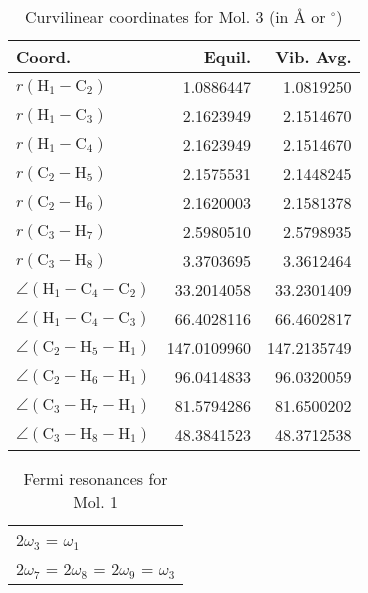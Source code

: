 \begin{table}
\centering
\caption{Curvilinear coordinates for Mol. 3 (in \AA{} or $^\circ$)}
\begin{tabular}{lrr}
       Coord.         &             Equil. &          Vib. Avg. \\
\hline
$r(\text{H}_{1} - \text{C}_{2})$ &          1.0886447 &          1.0819250 \\
$r(\text{H}_{1} - \text{C}_{3})$ &          2.1623949 &          2.1514670 \\
$r(\text{H}_{1} - \text{C}_{4})$ &          2.1623949 &          2.1514670 \\
$r(\text{C}_{2} - \text{H}_{5})$ &          2.1575531 &          2.1448245 \\
$r(\text{C}_{2} - \text{H}_{6})$ &          2.1620003 &          2.1581378 \\
$r(\text{C}_{3} - \text{H}_{7})$ &          2.5980510 &          2.5798935 \\
$r(\text{C}_{3} - \text{H}_{8})$ &          3.3703695 &          3.3612464 \\
$\angle(\text{H}_{1} - \text{C}_{4} - \text{C}_{2})$ &         33.2014058 &         33.2301409 \\
$\angle(\text{H}_{1} - \text{C}_{4} - \text{C}_{3})$ &         66.4028116 &         66.4602817 \\
$\angle(\text{C}_{2} - \text{H}_{5} - \text{H}_{1})$ &        147.0109960 &        147.2135749 \\
$\angle(\text{C}_{2} - \text{H}_{6} - \text{H}_{1})$ &         96.0414833 &         96.0320059 \\
$\angle(\text{C}_{3} - \text{H}_{7} - \text{H}_{1})$ &         81.5794286 &         81.6500202 \\
$\angle(\text{C}_{3} - \text{H}_{8} - \text{H}_{1})$ &         48.3841523 &         48.3712538 \\
\end{tabular}
\end{table}

\begin{table}
\centering
\caption{Fermi resonances for Mol. 1}
\begin{tabular}{l}
2$\omega_{3 }$ = $\omega_{1 }$ \\
2$\omega_{7 }$ = 2$\omega_{8 }$ = 2$\omega_{9 }$ = $\omega_{3 }$ \\
\end{tabular}
\end{table}

